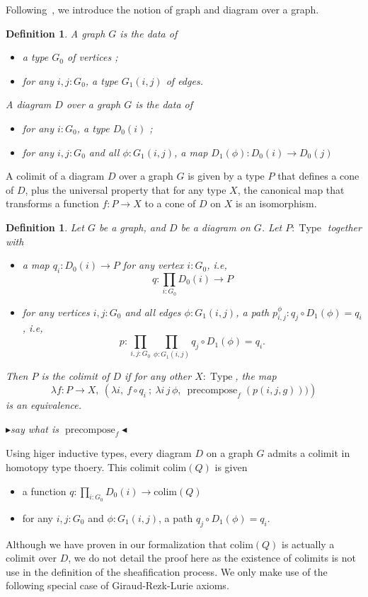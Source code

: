 \documentclass[conference]{IEEEtran}
\newtheorem{defi}[thm]{Definition}
\newcommand{\mynote}[2]{
    \fbox{\bfseries\sffamily\scriptsize#1}
    {\small$\blacktriangleright$\textsf{\emph{#2}}$\blacktriangleleft$}~}
\newcommand\nt[1]{\mynote{NT}{#1}}
\newcommand{\ie}{i.e,\xspace}
\DeclareMathOperator{\Type}{Type}
\DeclareMathOperator{\precompose}{\mathrm{precompose}}
\newcommand \colim[1] {\mathrm{colim}(Q)}
\begin{document}
Following~\cite{lumsdaine}, we introduce the notion of graph and
diagram over a graph.
%
\begin{defi}
  A {\em graph} $G$ is the data of
  \begin{itemize}
  \item a type $G_0$ of vertices ;
  \item for any $i,j:G_0$, a type $G_1(i,j)$ of edges.
  \end{itemize}

  A {\em diagram} $D$ over a graph $G$ is the data of
  \begin{itemize}
  \item for any $i:G_0$, a type $D_0(i)$ ;
  \item for any $i,j:G_0$ and all $\phi : G_1(i,j)$, a map $D_1(\phi)
    : D_0(i) \to D_0(j)$
  \end{itemize}
\end{defi}

A colimit of a diagram $D$ over a graph $G$ is given by a type $P$
that defines a cone of $D$, plus the universal property that for any
type $X$, the canonical map that transforms a function $f : P
\rightarrow X$ to a cone of $D$ on $X$ is an isomorphism.
% 
\begin{defi}
Let $G$ be a graph, and $D$ be a diagram on $G$. 
Let $P:\Type$ together with
\begin{itemize}
\item a map $q_i : D_0(i) \to P$ for any
vertex $i:G_0$, \ie $$q : \prod_{i:G_0} D_0(i) \to P$$
\item for any vertices $i,j:G_0$ and all edges $\phi:G_1(i,j)$, a path
  $p_{i,j}^\phi : q_j \circ D_1(\phi) = q_i$, \ie
  $$p : \prod_{i,j:G_0} \prod_{\phi:G_1(i,j)} q_j \circ D_1(\phi) = q_i.$$
\end{itemize}

Then $P$ is the {\em colimit} of $D$ if for any other $X:\Type$, the
map
$$\lambda f:P \to X,~ \left( \lambda i,~f \circ q_i~;~ \lambda i\, j\,
  \phi,~ \precompose_f (p(i, j, g))) \right)$$
is an equivalence.

\nt{say what is $\precompose_f $}
\end{defi}


Using higer inductive types, every diagram $D$ on a graph $G$ admits a
colimit in homotopy type thoery. This colimit $\colim D$ is given
%
\begin{itemize}
\item a function $q:\prod_{i:G_0} D_0(i) \to \colim D$
\item for any $i,j:G_0$ and $\phi:G_1(i,j)$, a path
  $q_j \circ D_1(\phi) = q_i$.
\end{itemize}
%
Although we have proven in our formalization that $\colim D$ is
actually a colimit over $D$, we do not detail the proof here as the
existence of colimits is not use in the definition of the
sheafification process. We only make use of the following special case
of Giraud-Rezk-Lurie axioms.
\end{document}
